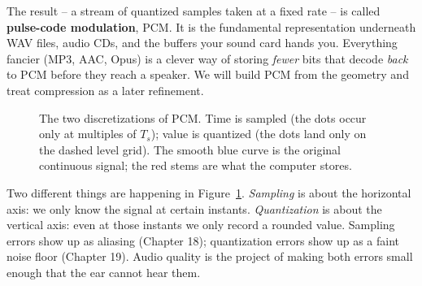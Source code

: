 The result -- a stream of quantized samples taken at a fixed rate -- is called \textbf{pulse-code
modulation}, PCM. It is the fundamental representation underneath WAV files, audio CDs, and the
buffers your sound card hands you. Everything fancier (MP3, AAC, Opus) is a clever way of storing
\emph{fewer} bits that decode \emph{back} to PCM before they reach a speaker. We will build PCM
from the geometry and treat compression as a later refinement.

\begin{figure}[H]
\centering
{}
\caption{The two discretizations of PCM. Time is sampled (the dots occur only at multiples of
$T_s$); value is quantized (the dots land only on the dashed level grid). The smooth blue curve
is the original continuous signal; the red stems are what the computer stores.}
\label{ch26:fig-pcm}
\end{figure}

\begin{happeningbox}
Two different things are happening in Figure~\ref{ch26:fig-pcm}. \emph{Sampling} is about the horizontal axis: we
only know the signal at certain instants. \emph{Quantization} is about the vertical axis: even at
those instants we only record a rounded value. Sampling errors show up as aliasing (Chapter 18);
quantization errors show up as a faint noise floor (Chapter 19). Audio quality is the project of
making both errors small enough that the ear cannot hear them.
\end{happeningbox}

